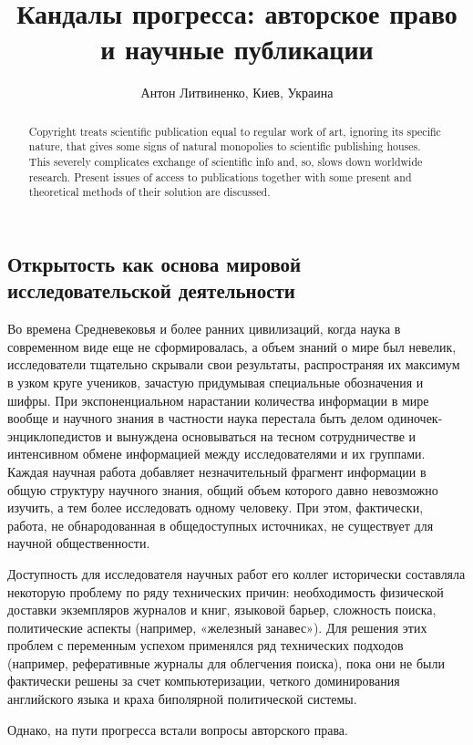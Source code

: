 \documentclass[10pt, a5paper]{article}
\begin{document}
\title{Кандалы прогресса: авторское право и научные публикации}
\author{Антон Литвиненко, Киев, Украина}
\maketitle
\begin{abstract}
Copyright treats scientific publication equal to regular work of art, ignoring its specific nature, that gives some signs of natural monopolies to scientific publishing houses. This severely complicates exchange of scientific info and, so, slows down worldwide research. Present issues of access to publications together with some present and theoretical methods of their solution are discussed.
\end{abstract}
\subsection*{Открытость как основа мировой исследовательской деятельности}

Во времена Средневековья и более ранних цивилизаций, когда наука в современном виде еще не сформировалась, а объем знаний о мире был невелик, исследователи тщательно скрывали свои результаты, распространяя их максимум в узком круге учеников, зачастую придумывая специальные обозначения и шифры. При экспоненциальном нарастании количества информации в мире вообще и научного знания в частности наука перестала быть делом одиночек-энциклопедистов и вынуждена основываться на тесном сотрудничестве и интенсивном обмене информацией между исследователями и их группами. Каждая научная работа добавляет незначительный фрагмент информации в общую структуру научного знания, общий объем которого давно невозможно изучить, а тем более исследовать одному человеку. При этом, фактически, работа, не обнародованная в общедоступных источниках, не существует для научной общественности.

Доступность для исследователя научных работ его коллег исторически составляла некоторую проблему по ряду технических причин: необходимость физической доставки экземпляров журналов и книг, языковой барьер, сложность поиска, политические аспекты (например, «железный занавес»). Для решения этих проблем с переменным успехом применялся ряд технических подходов (например, реферативные журналы для облегчения поиска), пока они не были фактически решены за счет компьютеризации, четкого доминирования английского языка и краха биполярной политической системы.

Однако, на пути прогресса встали вопросы авторского права.
\end{document}
